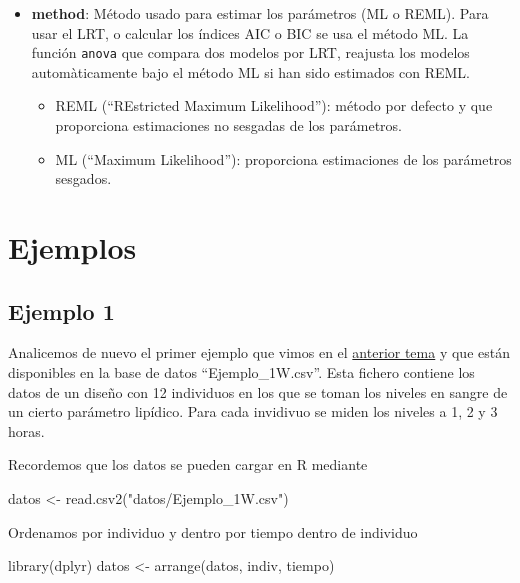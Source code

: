 \documentclass[
]{book}
\newenvironment{Shaded}{\begin{snugshade}}{\end{snugshade}}
\newcommand{\FunctionTok}[1]{\textcolor[rgb]{0.00,0.00,0.00}{#1}}
\newcommand{\NormalTok}[1]{#1}
\newcommand{\OtherTok}[1]{\textcolor[rgb]{0.56,0.35,0.01}{#1}}
\newcommand{\StringTok}[1]{\textcolor[rgb]{0.31,0.60,0.02}{#1}}
\begin{document}
\begin{itemize}
\item
  \textbf{method}: Método usado para estimar los parámetros (ML o REML). Para usar el LRT, o calcular los índices AIC o BIC se usa el método ML. La función \texttt{anova} que compara dos modelos por LRT, reajusta los modelos automàticamente bajo el método ML si han sido estimados con REML.

  \begin{itemize}
  \item
    REML (``REstricted Maximum Likelihood''): método por defecto y que proporciona estimaciones no sesgadas de los parámetros.
  \item
    ML (``Maximum Likelihood''): proporciona estimaciones de los parámetros sesgados.
  \end{itemize}
\end{itemize}

\hypertarget{ejemplos-2}{%
\section{Ejemplos}\label{ejemplos-2}}

\hypertarget{ejemplo-1}{%
\subsection{Ejemplo 1}\label{ejemplo-1}}

Analicemos de nuevo el primer ejemplo que vimos en el \protect\hyperlink{Ejemplo1}{anterior tema} y que están disponibles en la base de datos ``Ejemplo\_1W.csv''. Esta fichero contiene los datos de un diseño con 12 individuos en los que se toman los niveles en sangre de un cierto parámetro lipídico. Para cada invidivuo se miden los niveles a 1, 2 y 3 horas.

Recordemos que los datos se pueden cargar en R mediante

\begin{Shaded}
\begin{Highlighting}[]
\NormalTok{datos }\OtherTok{\textless{}{-}} \FunctionTok{read.csv2}\NormalTok{(}\StringTok{"datos/Ejemplo\_1W.csv"}\NormalTok{)}
\end{Highlighting}
\end{Shaded}

Ordenamos por individuo y dentro por tiempo dentro de individuo

\begin{Shaded}
\begin{Highlighting}[]
\FunctionTok{library}\NormalTok{(dplyr)}
\NormalTok{datos }\OtherTok{\textless{}{-}} \FunctionTok{arrange}\NormalTok{(datos, indiv, tiempo)}
\end{Highlighting}
\end{Shaded}
\end{document}
